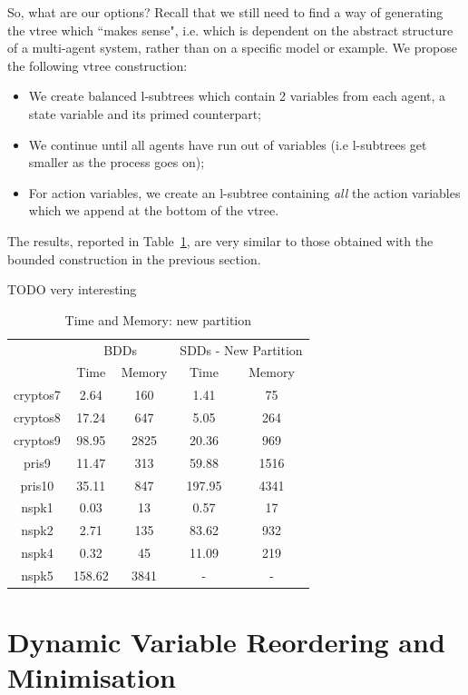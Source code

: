 \documentclass[11pt]{report}
\begin{document}
So, what are our options? Recall that we still need to find a way of generating the vtree which ``makes sense", i.e. which is dependent on the abstract structure of a multi-agent system, rather than on a specific model or example. 
We propose the following vtree construction:
\begin{itemize}
\item We create balanced l-subtrees which contain 2 variables from each agent, a state variable and its primed counterpart;
\item We continue until all agents have run out of variables (i.e l-subtrees get smaller as the process goes on);
\item For action variables, we create an l-subtree containing \textit{all} the action variables which we append at the bottom of the vtree.
\end{itemize}

The results, reported in Table~\ref{table:newpartition}, are very similar to those obtained with the bounded construction in the previous section. 

TODO very interesting 



\begin{table}
\centering
\begin{tabular}{|*{5}{c|}}
\hline
 & \multicolumn{2}{c|}{BDDs} & \multicolumn{2}{c|}{SDDs - New Partition } \\ \cline{2-5}
 & Time & Memory & Time & Memory \\ \hline
cryptos7 &2.64& 160& 1.41 & 75 \\ \hline
cryptos8 &17.24& 647& 5.05 & 264 \\ \hline
cryptos9 &98.95 &2825& 20.36 & 969 \\ \hline
pris9 &11.47 &313& 59.88 & 1516 \\ \hline
pris10 &35.11& 847& 197.95 & 4341 \\ \hline
nspk1 &0.03& 13 & 0.57 & 17 \\ \hline
nspk2 &2.71& 135& 83.62 & 932 \\ \hline
nspk4 &0.32& 45 & 11.09 & 219 \\ \hline
nspk5 &158.62& 3841& - &-  \\ \hline
\end{tabular}
\caption{Time and Memory: new partition}
\label{table:newpartition}
\end{table}


\section{Dynamic Variable Reordering and Minimisation}
\end{document}
